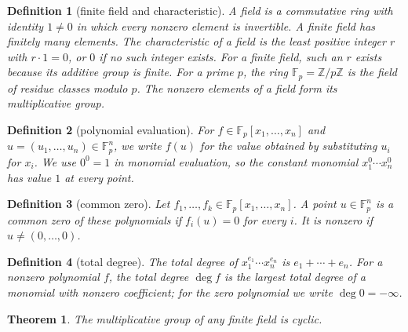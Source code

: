 \documentclass[11pt]{article}
\theoremstyle{ntstyle}
\newtheorem{theorem}{Theorem}[subsection]
\newtheorem{definition}{Definition}[subsection]
\begin{document}
\begin{definition}[finite field and characteristic]\label{def:6.10.1}
	A field is a commutative ring with identity $1\ne0$ in which every
	nonzero element is invertible. A finite field has finitely many elements. The
	characteristic of a field is the least positive integer $r$ with
	$r\cdot1=0$, or $0$ if no such integer exists. For a finite field,
	such an $r$ exists because its additive group is finite.
	For a prime $p$, the ring $\mathbb{F}_p=\mathbb{Z}/p\mathbb{Z}$ is the field of
	residue classes modulo $p$. The nonzero elements of a field form its
	multiplicative group.

\end{definition}
\begin{definition}[polynomial evaluation]\label{def:6.10.2}
	For $f\in\mathbb{F}_p[x_1,\ldots,x_n]$ and
	$u=(u_1,\ldots,u_n)\in\mathbb{F}_p^n$, we write $f(u)$ for the value obtained by
	substituting $u_i$ for $x_i$. We use $0^0=1$ in monomial evaluation, so
	the constant monomial $x_1^0\cdots x_n^0$ has value $1$ at every point.

\end{definition}
\begin{definition}[common zero]\label{def:6.10.3}
	Let $f_1,\ldots,f_k\in\mathbb{F}_p[x_1,\ldots,x_n]$. A point
	$u\in\mathbb{F}_p^n$ is a common zero of these polynomials if
	$f_i(u)=0$ for every $i$. It is nonzero if $u\neq(0,\ldots,0)$.

\end{definition}
\begin{definition}[total degree]\label{def:6.10.4}
	The total degree of $x_1^{e_1}\cdots x_n^{e_n}$ is
	$e_1+\cdots+e_n$. For a nonzero polynomial $f$, the total degree $\deg f$ is the largest
	total degree of a monomial with nonzero coefficient; for the zero polynomial we write $\deg0=-\infty$.

\end{definition}
\begin{theorem}\label{thm:6.10.1} The multiplicative group of any finite
	field is cyclic.

\end{theorem}
\end{document}
